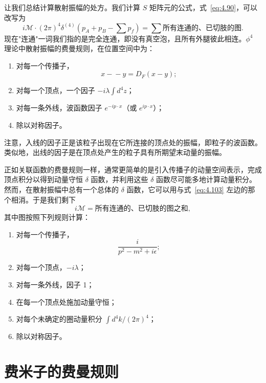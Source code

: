 让我们总结计算散射振幅的处方。我们计算 $S$ 矩阵元的公式，式~\eqref{eq:4.90}，可以改写为
\begin{equation}
  i\mathcal{M}\cdot(2\pi)^4\delta^{(4)}(p_A+p_B-\textstyle\sum p_f)
    = \sum \text{所有连通的、已切肢的图} .
  \label{eq:4.103}
\end{equation}
现在"连通"一词我们指的是完全连通，即没有真空泡，且所有外腿彼此相连。$\phi^4$ 理论中散射振幅的费曼规则，在位置空间中为：
\begin{enumerate}
  \item 对每一个传播子，
    \begin{equation}
      x\!-\!-\!y = D_F(x-y);
    \end{equation}
  \item 对每一个顶点，一个因子 $-i\lambda\int d^4z$；
  \item 对每一条外线，波函数因子 $e^{-ip\cdot x}$（或 $e^{ip\cdot x}$）；
  \item 除以对称因子。
\end{enumerate}
注意，入线的因子正是该粒子出现在它所连接的顶点处的振幅，即粒子的波函数。类似地，出线的因子是在顶点处产生的粒子具有所期望末动量的振幅。

正如关联函数的费曼规则一样，通常更简单的是引入传播子的动量空间表示，完成顶点积分以得到动量守恒 $\delta$ 函数，并利用这些 $\delta$ 函数尽可能多地计算动量积分。然而，在散射振幅中总有一个总体的 $\delta$ 函数，它可以用与式~\eqref{eq:4.103} 左边的那个相消。于是我们剩下
\begin{equation}
  i\mathcal{M} = \text{所有连通的、已切肢的图之和},
  \label{eq:4.104}
\end{equation}
其中图按照下列规则计算：
\begin{enumerate}
  \item 对每一个传播子，
    \begin{equation}
      \frac{i}{p^2-m^2+i\epsilon} ;
    \end{equation}
  \item 对每一个顶点，$-i\lambda$；
  \item 对每一条外线，因子 1；
  \item 在每一个顶点处施加动量守恒；
  \item 对每个未确定的圈动量积分 $\int d^4k/(2\pi)^4$；
  \item 除以对称因子。
\end{enumerate}

\section{费米子的费曼规则}

